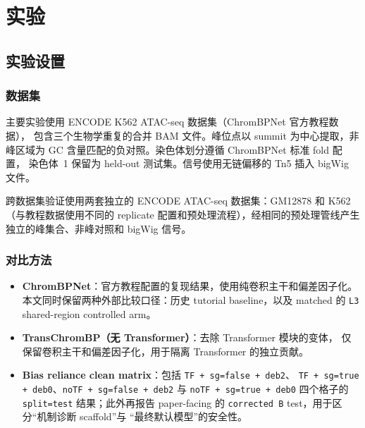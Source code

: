 \documentclass[11pt,a4paper]{ctexart}
\begin{document}
\section{实验}
\label{sec:experiments}

\subsection{实验设置}
\label{sec:setup}

\subsubsection{数据集}

主要实验使用 ENCODE K562 ATAC-seq 数据集（ChromBPNet 官方教程数据），
包含三个生物学重复的合并 BAM 文件。峰位点以 summit 为中心提取，非峰区域为
GC 含量匹配的负对照。染色体划分遵循 ChromBPNet 标准 fold 配置，
染色体~1 保留为 held-out 测试集。信号使用无链偏移的 Tn5 插入 bigWig 文件。

跨数据集验证使用两套独立的 ENCODE ATAC-seq 数据集：GM12878 和 K562
（与教程数据使用不同的 replicate 配置和预处理流程），经相同的预处理管线产生
独立的峰集合、非峰对照和 bigWig 信号。

\subsubsection{对比方法}

\begin{itemize}[leftmargin=2em]
  \item \textbf{ChromBPNet}：官方教程配置的复现结果，使用纯卷积主干和偏差因子化。
  本文同时保留两种外部比较口径：历史 tutorial baseline，以及 matched 的
  \texttt{L3} shared-region controlled arm。
  \item \textbf{TransChromBP（无 Transformer）}：去除 Transformer 模块的变体，
  仅保留卷积主干和偏差因子化，用于隔离 Transformer 的独立贡献。
  \item \textbf{Bias reliance clean matrix}：包括 \texttt{TF + sg=false + deb2}、
  \texttt{TF + sg=true + deb0}、\texttt{noTF + sg=false + deb2} 与
  \texttt{noTF + sg=true + deb0} 四个格子的 \texttt{split=test} 结果；此外再报告
  paper-facing 的 \texttt{corrected B} test，用于区分“机制诊断 scaffold”与
  “最终默认模型”的安全性。
\end{itemize}
\end{document}
